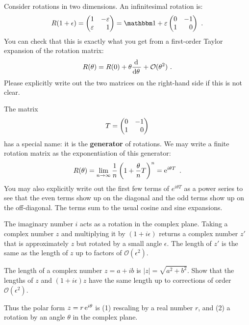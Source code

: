 \begin{example} Consider rotations in two dimensions. An infinitesimal rotation is:
\begin{align}
    R(1+\epsilon) = 
    \begin{pmatrix}
        1 & -\varepsilon \\
        \varepsilon & \pp 1
    \end{pmatrix}
    = 
    \one + \varepsilon 
    \begin{pmatrix}
        0 & - 1 \\
        1 & \pp 0
    \end{pmatrix} \ .
\end{align}
You can check that this is exactly what you get from a first-order Taylor expansion of the rotation matrix:
\begin{align}
    R(\theta) = 
    R(0)
    + \theta 
    \frac{\operatorname{d}\mkern-3mu^{}\mkern-1mu{}\,}{\operatorname{d}\mkern-3mu^{}\mkern-1mu{\theta}\,}  + \mathcal O(\theta^2) \ .
\end{align}
Please explicitly write out the two matrices on the right-hand side if this is not clear. 

The matrix 
\begin{align}
    T =\begin{pmatrix}
        0 & - 1 \\
        1 & \pp 0
    \end{pmatrix} 
\end{align}
has a special name: it is the \textbf{generator} of rotations. We may write a finite rotation matrix as the exponentiation of this generator:
\begin{align}
    R(\theta)  = 
    \lim_{n\to\infty} \frac{1}{n}
    \left(1+\frac{\theta}{n} T\right)^n
    = 
    \operatorname{e}^{i\theta T} \ .
\end{align}
You may also explicitly write out the first few terms of $e^{i\theta T}$ as a power series to see that the even terms show up on the diagonal and the odd terms show up on the off-diagonal. The terms sum to the usual cosine and sine expansions.
\end{example}

The imaginary number $i$ acts as a rotation in the complex plane. Taking a complex number $z$ and multiplying it by $(1+i\epsilon )$ returns a complex number $z'$ that is approximately $z$ but rotated by a small angle $\epsilon$. The length of $z'$ is the same as the length of $z$ up to factors of $\mathcal O(\epsilon^2)$.
\begin{exercise}
The length of a complex number $z=a+ib$ is $|z| = \sqrt{a^2 + b^2}$. Show that the lengths of $z$ and $(1+i \epsilon )z$ have the same length up to corrections of order $\mathcal O(\epsilon^2)$.
\end{exercise}
Thus the polar form $z=r\operatorname{e}^{i\theta}$ is (1) rescaling by a real number $r$, and (2) a rotation by an angle $\theta$ in the complex plane. 


